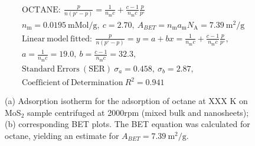 

\begin{align*}
&\mathrm{OCTANE:}\ \frac{p}{n(p^\circ-p)}=\frac{1}{n_\mathrm{m}c}+\frac{c-1}{n_\mathrm{m}c}\frac{p}{p^\circ}\\
&{n_\mathrm{m}}=0.0195\ \mathrm{mMol/g},\ c=2.70,\ A_{BET}={n_\mathrm{m}}{a_\mathrm{m}}{N_\mathrm{A}}=7.39\ \mathrm{m}^2\mathrm{/g}\\
&\mathrm{Linear\ model\ fitted:}\ \frac{p}{n(p^\circ-p)}=y=a+bx=\frac{1}{n_\mathrm{m}c}+\frac{c-1}{n_\mathrm{m}c}\frac{p}{p^\circ},\\
&a=\frac{1}{n_\mathrm{m}c}=19.0,\ b=\frac{c-1}{n_\mathrm{m}c}=32.3,\\
&\mathrm{Standard\ Errors\ (SER)}\ \sigma_a=0.458,\ \sigma_b=2.87,\\
&\mathrm{Coefficient\ of\ Determination}\ R^2 = 0.941
\end{align*}


\begin{figure}[htb]
\hfill
{}
\caption{(a) Adsorption isotherm for the adsorption of octane at XXX K on MoS$_2$ 
sample centrifuged at 2000rpm (mixed bulk and nanosheets);
(b) corresponding BET plots. The BET equation was calculated for octane, yielding an estimate for $A_{BET}=7.39\ \mathrm{m}^2\mathrm{/g}$.}

\label{fig:sa-Reference-As-Supplied-13mg-2mm-30C-S3-SA-10ml}
\end{figure}


